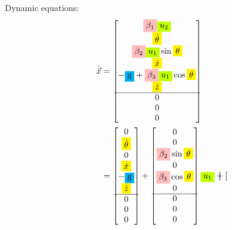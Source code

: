 \documentclass[12pt]{article}
\begin{document}
Dynamic equations:
\begin{align*}
    \dot{\vec{x}} &= \begin{bmatrix}
        \colorbox{pink}{$\beta_1$} \colorbox{lime}{$u_2$} \\
        \colorbox{yellow}{$\dot{\theta}$} \\
        \colorbox{pink}{$\beta_2$} \colorbox{lime}{$u_1$} \sin{\colorbox{yellow}{$\theta$}} \\ 
        \colorbox{yellow}{$\dot{x}$} \\
        -\colorbox{cyan}{g}+\colorbox{pink}{$\beta_3$} \colorbox{lime}{$u_1$} \cos{\colorbox{yellow}{$\theta$}} \\
        \colorbox{yellow}{$\dot{z}$} \\
        \hline
        0 \\
        0 \\
        0 \\
    \end{bmatrix} \\
    &= \begin{bmatrix}
            0 \\
            \colorbox{yellow}{$\dot{\theta}$} \\
            0 \\
            \colorbox{yellow}{$\dot{x}$} \\
            -\colorbox{cyan}{g} \\
            \colorbox{yellow}{$\dot{z}$} \\
            \hline
            0 \\
            0 \\
            0 \\
        \end{bmatrix} +  \begin{bmatrix}
            0 \\
            0 \\
            \colorbox{pink}{$\beta_2$} \sin{\colorbox{yellow}{$\theta$}} \\
            0 \\
            \colorbox{pink}{$\beta_3$} \cos{\colorbox{yellow}{$\theta$}} \\
            0 \\
            \hline
            0 \\
            0 \\
            0 \\
        \end{bmatrix} \colorbox{lime}{$u_1$} +  \begin{bmatrix}

\end{bmatrix}
\end{align*}
\end{document}
